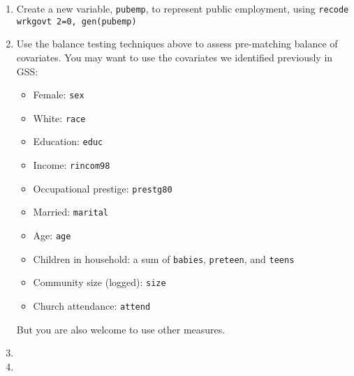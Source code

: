 \documentclass[a4paper,12pt]{article}
\begin{document}
\begin{enumerate}
\item Create a new variable, \texttt{pubemp}, to represent public employment, using \texttt{recode wrkgovt 2=0, gen(pubemp)}
\item Use the balance testing techniques above to assess pre-matching balance of covariates. You may want to use the covariates we identified previously in GSS:
	\begin{itemize}
	\item Female: \texttt{sex}
	\item White: \texttt{race}
	\item Education: \texttt{educ}
	\item Income: \texttt{rincom98}
	\item Occupational prestige: \texttt{prestg80}
	\item Married: \texttt{marital}
	\item Age: \texttt{age}
	\item Children in household: a sum of \texttt{babies}, \texttt{preteen}, and \texttt{teens}
	\item Community size (logged): \texttt{size}
	\item Church attendance: \texttt{attend}
	\end{itemize}
But you are also welcome to use other measures.

\item %
\item %



\end{enumerate}
\end{document}
